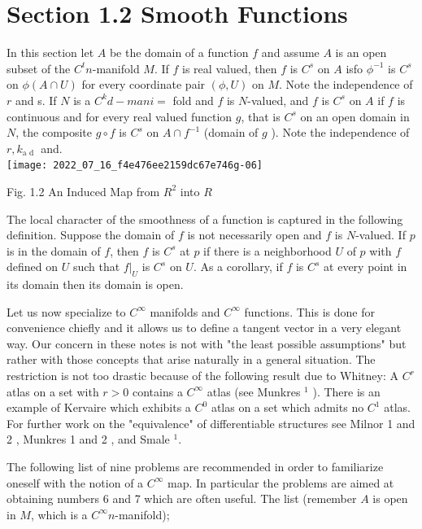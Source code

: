 \documentclass[10pt]{article}
\begin{document}
\section{Section 1.2 Smooth Functions}
In this section let $A$ be the domain of a function $f$ and assume $A$ is an open subset of the $C^{t} n$-manifold $M$. If $f$ is real valued, then $f$ is $C^{s}$ on $A$ isfo $\phi^{-1}$ is $C^{s}$ on $\phi(A \cap U)$ for every coordinate pair $(\phi, U)$ on $M .$ Note the independence of $r$ and s. If $N$ is a $C^{k} d-m a n i=$ fold and $f$ is $N$-valued, and $f$ is $C^{s}$ on $A$ if $f$ is continuous and for every real valued function $g$, that is $C^{s}$ on an open domain in $N$, the composite $g \circ f$ is $C^{s}$ on $A \cap f^{-1}$ (domain of $g$ ). Note the independence of $r, k_{\text {a d }}$ and.\\

\texttt{[image: 2022\_07\_16\_f4e476ee2159dc67e746g-06]}

Fig. 1.2 An Induced Map from $R^{2}$ into $R$

The local character of the smoothness of a function is captured in the following definition. Suppose the domain of $f$ is not necessarily open and $f$ is $N$-valued. If $p$ is in the domain of $f$, then $f$ is $C^{s}$ at $p$ if there is a neighborhood $U$ of $p$ with $f$ defined on $U$ such that $\left.f\right|_{U}$ is $C^{s}$ on $U$. As a corollary, if $f$ is $C^{s}$ at every point in its domain then its domain is open.

Let us now specialize to $C^{\infty}$ manifolds and $C^{\infty}$ functions. This is done for convenience chiefly and it allows us to define a tangent vector in a very elegant way. Our concern in these notes is not with "the least possible assumptions" but rather with those concepts that arise naturally in a general situation. The restriction is not too drastic because of the following result due to Whitney: A $C^{r}$ atlas on a set with $r>0$ contains a $C^{\infty}$ atlas (see Munkres ${ }^{1}$ ). There is an example of Kervaire which exhibits a $C^{0}$ atlas on a set which admits no $C^{1}$ atlas. For further work on the "equivalence" of differentiable structures see Milnor 1 and 2 , Munkres 1 and 2 , and Smale ${ }^{1}$.

The following list of nine problems are recommended in order to familiarize oneself with the notion of a $C^{\infty}$ map. In particular the problems are aimed at obtaining numbers 6 and 7 which are often useful. The list (remember $A$ is open in $M$, which is a $C^{\infty} n$-manifold);
\end{document}
